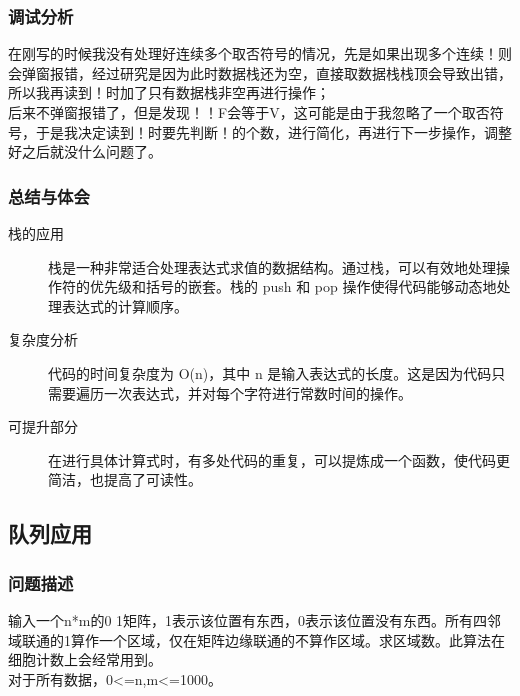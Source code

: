 \documentclass[12pt]{article}
\begin{document}
\subsubsection{调试分析}
{\songti 在刚写的时候我没有处理好连续多个取否符号的情况，先是如果出现多个连续！则会弹窗报错，经过研究是因为此时数据栈还为空，直接取数据栈栈顶会导致出错，所以我再读到！时加了只有数据栈非空再进行操作；\\
后来不弹窗报错了，但是发现！！F会等于V，这可能是由于我忽略了一个取否符号，于是我决定读到！时要先判断！的个数，进行简化，再进行下一步操作，调整好之后就没什么问题了。}
\subsubsection{总结与体会}
\begin{description}
    \item[栈的应用] 栈是一种非常适合处理表达式求值的数据结构。通过栈，可以有效地处理操作符的优先级和括号的嵌套。栈的 push 和 pop 操作使得代码能够动态地处理表达式的计算顺序。
    \item[复杂度分析] 代码的时间复杂度为 O(n)，其中 n 是输入表达式的长度。这是因为代码只需要遍历一次表达式，并对每个字符进行常数时间的操作。
    \item[可提升部分] 在进行具体计算式时，有多处代码的重复，可以提炼成一个函数，使代码更简洁，也提高了可读性。
\end{description}
\subsection{队列应用}
\subsubsection{问题描述}
{\songti 输入一个n*m的0 1矩阵，1表示该位置有东西，0表示该位置没有东西。所有四邻域联通的1算作一个区域，仅在矩阵边缘联通的不算作区域。求区域数。此算法在细胞计数上会经常用到。\\
对于所有数据，0<=n,m<=1000。}
\end{document}
